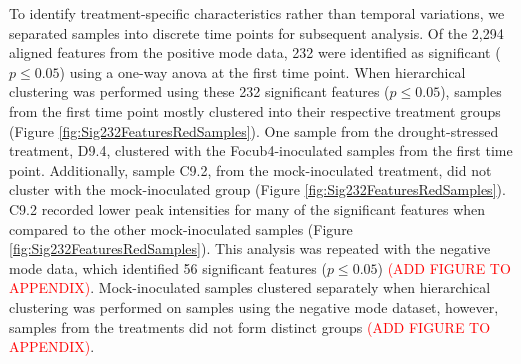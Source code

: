 To identify treatment-specific characteristics rather than temporal variations, we separated samples into discrete time points for subsequent analysis. Of the 2,294 aligned features from the positive mode data, 232 were identified as significant ($p \le0.05$) using a one-way \ac{anova} at the first time point. When hierarchical clustering was performed using these 232 significant features ($p \le0.05$), samples from the first time point mostly clustered into their respective treatment groups (Figure \ref{fig:Sig232FeaturesRedSamples}). One sample from the drought-stressed treatment, D9.4, clustered with the \ac{Focub4}-inoculated samples from the first time point. Additionally, sample C9.2, from the mock-inoculated treatment, did not cluster with the mock-inoculated group (Figure \ref{fig:Sig232FeaturesRedSamples}). C9.2 recorded lower peak intensities for many of the significant features when compared to the other mock-inoculated samples (Figure \ref{fig:Sig232FeaturesRedSamples}). This analysis was repeated with the negative mode data, which identified 56 significant features ($p \le0.05$) \textcolor{red}{(ADD FIGURE TO APPENDIX)}. Mock-inoculated samples clustered separately when hierarchical clustering was performed on samples using the negative mode dataset, however, samples from the treatments did not form distinct groups \textcolor{red}{(ADD FIGURE TO APPENDIX)}.


